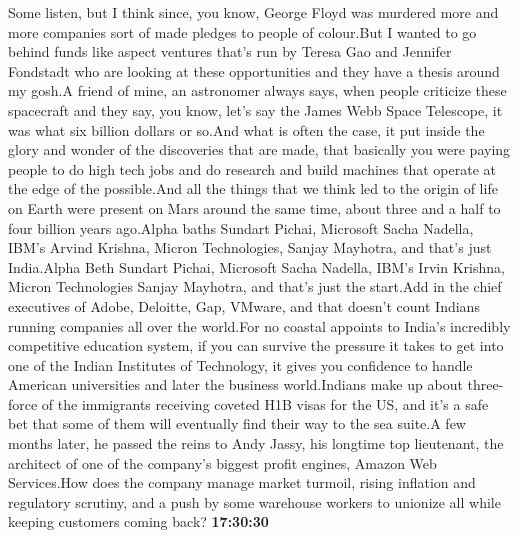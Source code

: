 \documentclass{article}%
\begin{document}
Some listen, but I think since, you know, George Floyd was murdered more and more companies sort of made pledges to people of colour.But I wanted to go behind funds like aspect ventures that's run by Teresa Gao and Jennifer Fondstadt who are looking at these opportunities and they have a thesis around my gosh.A friend of mine, an astronomer always says, when people criticize these spacecraft and they say, you know, let's say the James Webb Space Telescope, it was what six billion dollars or so.And what is often the case, it put inside the glory and wonder of the discoveries that are made, that basically you were paying people to do high tech jobs and do research and build machines that operate at the edge of the possible.And all the things that we think led to the origin of life on Earth were present on Mars around the same time, about three and a half to four billion years ago.Alpha baths Sundart Pichai, Microsoft Sacha Nadella, IBM's Arvind Krishna, Micron Technologies, Sanjay Mayhotra, and that's just  India.Alpha Beth Sundart Pichai, Microsoft Sacha Nadella, IBM's Irvin Krishna, Micron Technologies Sanjay Mayhotra, and that's just the start.Add in the chief executives of Adobe, Deloitte, Gap, VMware, and that doesn't count Indians running companies all over the world.For no coastal appoints to India's incredibly competitive education system, if you can survive the pressure it takes to get into one of the Indian Institutes of Technology, it gives you confidence to handle American universities and later the business world.Indians make up about three{-}force of the immigrants receiving coveted H1B visas for the US, and it's a safe bet that some of them will eventually find their way to the sea suite.A few months later, he passed the reins to Andy Jassy, his longtime top lieutenant, the architect of one of the company's biggest profit engines, Amazon Web Services.How does the company manage market turmoil, rising inflation and regulatory scrutiny, and a push by some warehouse workers to unionize all while keeping customers coming back?%
\textbf{17:30:30}%
\newline%
\end{document}
